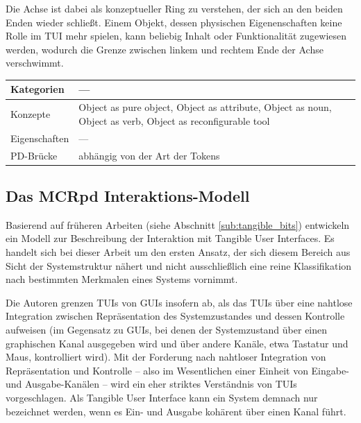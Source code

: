 Die Achse ist dabei als konzeptueller Ring zu verstehen, der sich an den beiden Enden wieder schließt. Einem Objekt, dessen physischen Eigenenschaften keine Rolle im \gls{TUI} mehr spielen, kann beliebig Inhalt oder Funktionalität zugewiesen werden, wodurch die Grenze zwischen linkem und rechtem Ende der Achse verschwimmt.
\\[1em]
\begin{tabular}{| p{3cm} | p{10cm} |}
  \hline
  Kategorien & --- \\ \hline
  Konzepte & Object as pure object, Object as attribute, Object as noun, Object as verb, Object as reconfigurable tool  \\ \hline
  Eigenschaften & --- \\ \hline
  PD-Brücke & abhängig von der Art der Tokens  \\ \hline
\end{tabular} 

\subsection{Das MCRpd Interaktions-Modell} %
\label{sub:mcrpd}

Basierend auf früheren Arbeiten (siehe Abschnitt \ref{sub:tangible_bits}) entwickeln \citet{Ullmer00} ein Modell zur Beschreibung der Interaktion mit Tangible User Interfaces. Es handelt sich bei dieser Arbeit um den ersten Ansatz, der sich diesem Bereich aus Sicht der Systemstruktur nähert und nicht ausschließlich eine reine Klassifikation nach bestimmten Merkmalen eines Systems vornimmt.

Die Autoren grenzen \glspl{TUI} von \glspl{GUI} insofern ab, als das \glspl{TUI} über eine nahtlose Integration zwischen Repräsentation des Systemzustandes und dessen Kontrolle aufweisen (im Gegensatz zu \glspl{GUI}, bei denen der Systemzustand über einen graphischen Kanal ausgegeben wird und über andere Kanäle, etwa Tastatur und Maus, kontrolliert wird). Mit der Forderung nach nahtloser Integration von Repräsentation und Kontrolle -- also im Wesentlichen einer Einheit von Eingabe- und Ausgabe-Kanälen -- wird ein eher striktes Verständnis von \glspl{TUI} vorgeschlagen. Als Tangible User Interface kann ein System demnach nur bezeichnet werden, wenn es Ein- und Ausgabe kohärent über einen Kanal führt.



